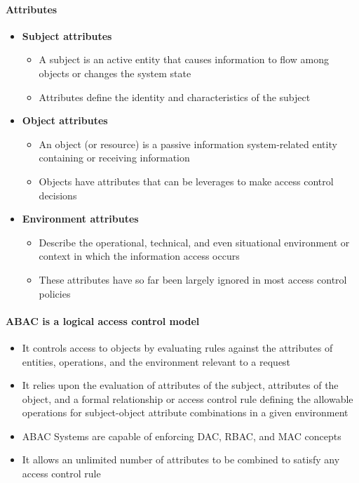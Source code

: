 \paragraph{Attributes}
\begin{itemize}
    \item \textbf{Subject attributes}
    \begin{itemize}
        \item A subject is an active entity that causes information to flow among objects or changes the system state
        \item Attributes define the identity and characteristics of the subject
    \end{itemize}
    \item \textbf{Object attributes}
    \begin{itemize}
        \item An object (or resource) is a passive information system-related entity containing or receiving information
        \item Objects have attributes that can be leverages to make access control decisions
    \end{itemize}
    \item \textbf{Environment attributes}
    \begin{itemize}
        \item Describe the operational, technical, and even situational environment or context in which the information access occurs
        \item These attributes have so far been largely ignored in most access control policies
    \end{itemize}
\end{itemize}

\paragraph{ABAC is a logical access control model}
\begin{itemize}
    \item It controls access to objects by evaluating rules against the attributes of entities, operations, and the environment relevant to a request
    \item It relies upon the evaluation of attributes of the subject, attributes of the object, and a formal relationship or access control rule defining the allowable operations for subject-object attribute combinations in a given environment
    \item ABAC Systems are capable of enforcing DAC, RBAC, and MAC concepts
    \item It allows an unlimited number of attributes to be combined to satisfy any access control rule
\end{itemize}

